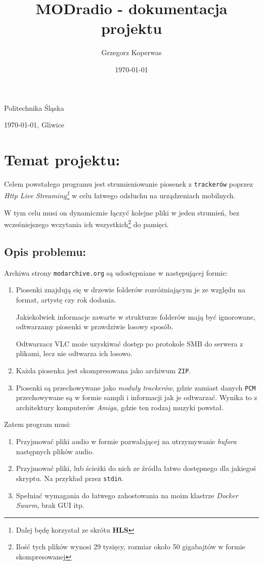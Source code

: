 \documentclass[a4paper,12pt]{article}
\title{MODradio - dokumentacja projektu}
\author{Grzegorz Koperwas}
\date{\today}
\renewcommand{\maketitle}{
    \begin{titlepage}
        \vspace*{4cm}

        \Large{\textbf{\thetitle}}

        \vspace*{1cm}

        \large{\theauthor}

        \vfill
    
        \begin{center}
            \footnotesize 
            Politechnika Śląska 
            
            \vspace*{1em}

            \today, Gliwice
        \end{center}
            
        \vspace*{1cm}
        
    \end{titlepage}
}
\begin{document}
\maketitle

\section{Temat projektu:}

Celem powstałego programu jest strumieniowanie piosenek z \texttt{trackerów}
poprzez \emph{Http Live Streaming\footnote{Dalej będę korzystał ze skrótu
\textbf{HLS}}} w celu łatwego odsłuchu na urządzeniach
mobilnych.

W tym celu musi on dynamicznie łączyć kolejne pliki w jeden strumień, bez
wcześniejszego wczytania ich wszystkich\footnote{Ilość tych plików wynosi 29 tysięcy,
rozmiar około 50 gigabajtów w formie skompresowanej} do pamięci.

\subsection*{Opis problemu:}

Archiwa strony \texttt{modarchive.org} są udostępniane w następującej formie:

\begin{enumerate}
        \item Piosenki znajdują się w drzewie folderów rozróżniającym je ze
            względu na format, artystę czy rok dodania. 

            Jakiekolwiek informacje zawarte w strukturze folderów mają być
            ignorowane, odtwarzamy piosenki w prawdziwie losowy sposób.

            Odtwarzacz VLC
            może uzyskiwać dostęp po protokole SMB do serwera z plikami, lecz
            nie odtwarza ich losowo.

        \item Każda piosenka jest skompresowana jako archiwum \texttt{ZIP}.

        \item Piosenki są przechowywane jako \emph{moduły trackerów}, gdzie
            zamiast danych \texttt{PCM} przechowywane są w formie sampli i
            informacji jak je odtwarzać. Wynika to z architektury komputerów
            \emph{Amiga}, gdzie ten rodzaj muzyki powstał.
\end{enumerate}

Zatem program musi:

\begin{enumerate}
        \item Przyjmować pliki audio w formie pozwalającej na utrzymywanie
            \emph{bufora} następnych plików audio.
        \item Przyjmować pliki, lub ścieżki do nich ze źródła łatwo dostępnego 
            dla jakiegoś skryptu. Na przykład przez \texttt{stdin}.
        \item Spełniać wymagania do łatwego zahostowania na moim klastrze
            \emph{Docker Swarm}, brak GUI itp.
\end{enumerate}
\end{document}
